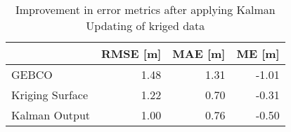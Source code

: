 \begin{table}
\centering
\caption{Improvement in error metrics after applying Kalman Updating of kriged data}
\label{tab:Petten_gebco_raster_error}
\begin{tabular}{lrrr}
\toprule
 & RMSE [m] & MAE [m] & ME [m] \\
\midrule
GEBCO & 1.48 & 1.31 & -1.01 \\
Kriging Surface & 1.22 & 0.70 & -0.31 \\
Kalman Output& 1.00 & 0.76 & -0.50 \\
\bottomrule
\end{tabular}
\end{table}
